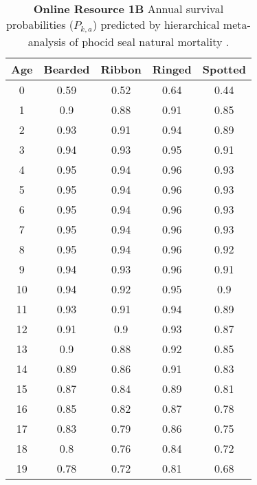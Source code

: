 \documentclass{svjour3}
\begin{document}
\begin{table}[htbp]
  \centering
  \caption{\textbf{Online Resource 1B} Annual survival probabilities ($P_{k,a}$) predicted by hierarchical meta-analysis of phocid seal natural mortality \citep{TrukhanovaEtAl2018}.}
    \begin{tabular}{p{4.215em}cccc}
    \toprule
    \toprule
    \textbf{Age} & \multicolumn{1}{p{4.215em}}{\textbf{Bearded}} & \multicolumn{1}{p{4.215em}}{\textbf{Ribbon}} & \multicolumn{1}{p{4.215em}}{\textbf{Ringed}} & \multicolumn{1}{p{4.215em}}{\textbf{Spotted}} \\
    \midrule
    \multicolumn{1}{c}{0} & 0.59  & 0.52  & 0.64  & 0.44 \\
    \multicolumn{1}{c}{1} & 0.9   & 0.88  & 0.91  & 0.85 \\
    \multicolumn{1}{c}{2} & 0.93  & 0.91  & 0.94  & 0.89 \\
    \multicolumn{1}{c}{3} & 0.94  & 0.93  & 0.95  & 0.91 \\
    \multicolumn{1}{c}{4} & 0.95  & 0.94  & 0.96  & 0.93 \\
    \multicolumn{1}{c}{5} & 0.95  & 0.94  & 0.96  & 0.93 \\
    \multicolumn{1}{c}{6} & 0.95  & 0.94  & 0.96  & 0.93 \\
    \multicolumn{1}{c}{7} & 0.95  & 0.94  & 0.96  & 0.93 \\
    \multicolumn{1}{c}{8} & 0.95  & 0.94  & 0.96  & 0.92 \\
    \multicolumn{1}{c}{9} & 0.94  & 0.93  & 0.96  & 0.91 \\
    \multicolumn{1}{c}{10} & 0.94  & 0.92  & 0.95  & 0.9 \\
    \multicolumn{1}{c}{11} & 0.93  & 0.91  & 0.94  & 0.89 \\
    \multicolumn{1}{c}{12} & 0.91  & 0.9   & 0.93  & 0.87 \\
    \multicolumn{1}{c}{13} & 0.9   & 0.88  & 0.92  & 0.85 \\
    \multicolumn{1}{c}{14} & 0.89  & 0.86  & 0.91  & 0.83 \\
    \multicolumn{1}{c}{15} & 0.87  & 0.84  & 0.89  & 0.81 \\
    \multicolumn{1}{c}{16} & 0.85  & 0.82  & 0.87  & 0.78 \\
    \multicolumn{1}{c}{17} & 0.83  & 0.79  & 0.86  & 0.75 \\
    \multicolumn{1}{c}{18} & 0.8   & 0.76  & 0.84  & 0.72 \\
    \multicolumn{1}{c}{19} & 0.78  & 0.72  & 0.81  & 0.68 \\

\end{tabular}
\end{table}
\end{document}
